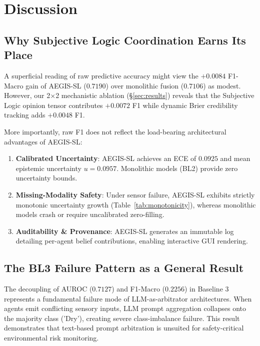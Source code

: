 \section{Discussion}
\label{sec:discussion}

\subsection{Why Subjective Logic Coordination Earns Its Place}
A superficial reading of raw predictive accuracy might view the $+0.0084$ F1-Macro gain of AEGIS-SL ($0.7190$) over monolithic fusion ($0.7106$) as modest. However, our 2$\times$2 mechanistic ablation (§\ref{sec:results}) reveals that the Subjective Logic opinion tensor contributes $+0.0072$ F1 while dynamic Brier credibility tracking adds $+0.0048$ F1. 

More importantly, raw F1 does not reflect the load-bearing architectural advantages of AEGIS-SL:
\begin{enumerate}
    \item \textbf{Calibrated Uncertainty}: AEGIS-SL achieves an ECE of $0.0925$ and mean epistemic uncertainty $u=0.0957$. Monolithic models (BL2) provide zero uncertainty bounds.
    \item \textbf{Missing-Modality Safety}: Under sensor failure, AEGIS-SL exhibits strictly monotonic uncertainty growth (Table~\ref{tab:monotonicity}), whereas monolithic models crash or require uncalibrated zero-filling.
    \item \textbf{Auditability \& Provenance}: AEGIS-SL generates an immutable log detailing per-agent belief contributions, enabling interactive GUI rendering.
\end{enumerate}

\subsection{The BL3 Failure Pattern as a General Result}
The decoupling of AUROC ($0.7127$) and F1-Macro ($0.2256$) in Baseline 3 represents a fundamental failure mode of LLM-as-arbitrator architectures. When agents emit conflicting sensory inputs, LLM prompt aggregation collapses onto the majority class ('Dry'), creating severe class-imbalance failure. This result demonstrates that text-based prompt arbitration is unsuited for safety-critical environmental risk monitoring.

